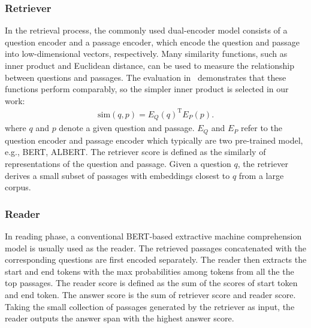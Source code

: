 \subsubsection{Retriever}\label{subsec:Retrieving and Reading}
In the retrieval process, the commonly used dual-encoder model \cite{bromley1993signature} consists of a question encoder and a passage encoder, which encode the question and passage into low-dimensional vectors, respectively. Many similarity functions, such as inner product and Euclidean distance, can be used to measure the relationship between questions and passages. The evaluation in~\cite{karpukhin2020dense} demonstrates that these functions perform comparably, so the simpler inner product is selected in our work:
\vspace{-0.05in}
\begin{equation}\label{eq:inner}%
\begin{aligned}
\mathrm{sim}(q,p) = E_Q(q)^\mathrm{T}E_P(p).
\end{aligned}
\end{equation}
where $q$ and $p$ denote a given question and passage. $E_Q$ and $E_P$ refer to the question encoder and passage encoder which typically are two pre-trained model, e.g., BERT\cite{devlin2018bert}, ALBERT\cite{lan2020albert}. 
The retriever score is defined as the similarly of representations of the question and passage.
Given a question $q$, the retriever derives a small subset of passages with embeddings closest to $q$ from a large corpus.

\subsubsection{Reader}\label{subsec:Retrieving and Reading}
In reading phase, a conventional BERT-based extractive machine comprehension model is usually used as the reader. The retrieved passages concatenated with the corresponding questions are first encoded separately. 
The reader then extracts the start and end tokens with the max probabilities among tokens from all the the top passages.
The reader score is defined as the sum of the scores of start token and end token. The answer score is the sum of retriever score and reader score.
Taking the small collection of passages generated by the retriever as input, the reader outputs the answer span with the highest answer score.

